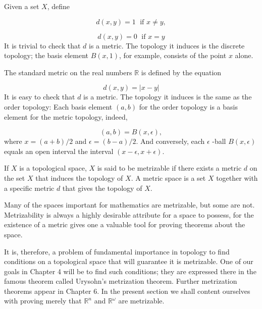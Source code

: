 \begin{centeredblock}
\begin{example}
\label{ex:\thesection.\theexample}
 Given a set \(X\), define

 \[
 d( {x,y}) = 1\;\text{ if }x \neq y,
 \]

 \[
 d( {x,y}) = 0\;\text{ if }x = y
 \]
 It is trivial to check that \(d\) is a metric. The topology it induces is the discrete topology; the basis element \(B( {x,1})\), for example, consists of the point \(x\) alone.
\end{example}
\end{centeredblock}

\begin{centeredblock*}
\begin{example}
\label{ex:\thesection.\theexample}
 The standard metric on the real numbers \(\mathbb{R}\) is defined by the equation

 \[
 d( {x,y}) = | {x - y}|
 \]
 It is easy to check that \(d\) is a metric. The topology it induces is the same as the order topology: Each basis element \((a, b)\) for the order topology is a basis element for the metric topology, indeed,

 \[
 ( {a,b}) = B( {x,\epsilon }),
 \]
 where \(x = ( {a + b}) /2\) and \(\epsilon = ( {b - a}) /2\). And conversely, each \(\epsilon\) -ball \(B( {x,\epsilon })\) equals an open interval the interval \(( {x - \epsilon,x + \epsilon })\).
\end{example}
\end{centeredblock*}

\begin{definition}
 If \(X\) is a topological space, \(X\) is said to be metrizable if there exists a metric \(d\) on the set \(X\) that induces the topology of \(X\). A metric space is a set \(X\) together with a specific metric \(d\) that gives the topology of \(X\).
\end{definition}

Many of the spaces important for mathematics are metrizable, but some are not. Metrizability is always a highly desirable attribute for a space to possess, for the existence of a metric gives one a valuable tool for proving theorems about the space.

It is, therefore, a problem of fundamental importance in topology to find conditions on a topological space that will guarantee it is metrizable. One of our goals in Chapter 4 will be to find such conditions; they are expressed there in the famous theorem called Urysohn's metrization theorem. Further metrization theorems appear in Chapter 6. In the present section we shall content ourselves with proving merely that \(\mathbb{R}^{n}\) and \(\mathbb{R}^{\omega }\) are metrizable.

